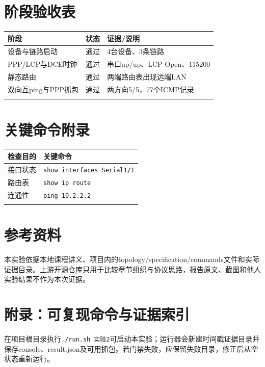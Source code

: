 \documentclass[UTF8,a4paper,12pt]{ctexart}
\begin{document}
\section{阶段验收表}
\begin{longtable}{p{}p{}p{}}\toprule 阶段 & 状态 & 证据/说明\\\midrule
设备与链路启动 & 通过 & 4台设备、3条链路\\
PPP/LCP与DCE时钟 & 通过 & 串口up/up、LCP Open、115200\\
静态路由 & 通过 & 两端路由表出现远端LAN\\
双向互ping与PPP抓包 & 通过 & 两方向5/5，77个ICMP记录\\\\\bottomrule\end{longtable}
\section{关键命令附录}
\begin{longtable}{p{}p{}}\toprule 检查目的 & 关键命令\\\midrule
接口状态 & \texttt{show interfaces Serial1/1}\\
路由表 & \texttt{show ip route}\\
连通性 & \texttt{ping 10.2.2.2}\\\\\bottomrule\end{longtable}
\section{参考资料}
本实验依据本地课程讲义、项目内的topology/specification/commands文件和实际证据目录。上游开源仓库只用于比较章节组织与协议思路，报告原文、截图和他人实验结果不作为本次证据。
\section{附录：可复现命令与证据索引}
在项目根目录执行\texttt{./run.sh 实验2}可启动本实验；运行器会新建时间戳证据目录并保存console、result.json及可用抓包。若门禁失败，应保留失败目录，修正后从空状态重新运行。
\end{document}
